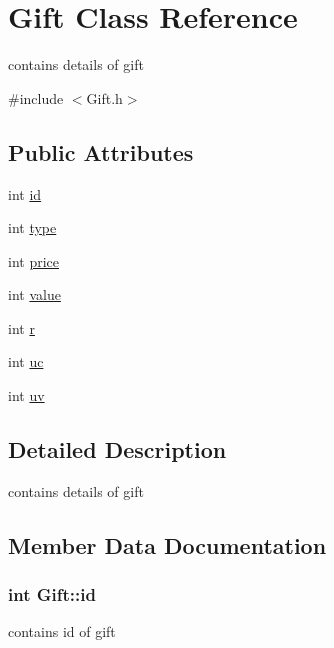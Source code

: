 \hypertarget{classGift}{}\section{Gift Class Reference}
\label{classGift}


contains details of gift  




{\ttfamily \#include $<$Gift.\+h$>$}

\subsection*{Public Attributes}
\begin{DoxyCompactItemize}
\item 
int \hyperlink{classGift_a145f971b2591cd6a363d4602c33d5d91}{id}
\item 
int \hyperlink{classGift_a63fb63fdc6f0821417039da90a54ad4c}{type}
\item 
int \hyperlink{classGift_ad795362f286e8d5d73514fb64ac478b8}{price}
\item 
int \hyperlink{classGift_a71d14b92ebfd06993afe584f088bc748}{value}
\item 
int \hyperlink{classGift_a0ab190c8bc8c7fb9e9f03d1330e8364d}{r}
\item 
int \hyperlink{classGift_abd83865cced98ae42e9a05a731afc655}{uc}
\item 
int \hyperlink{classGift_af1267b1ec483852362e8512ab3bdea5a}{uv}
\end{DoxyCompactItemize}


\subsection{Detailed Description}
contains details of gift 

\subsection{Member Data Documentation}
\subsubsection[{\texorpdfstring{id}{id}}]{\setlength{\rightskip}{0pt plus 5cm}int Gift\+::id}\hypertarget{classGift_a145f971b2591cd6a363d4602c33d5d91}{}\label{classGift_a145f971b2591cd6a363d4602c33d5d91}
contains id of gift 
